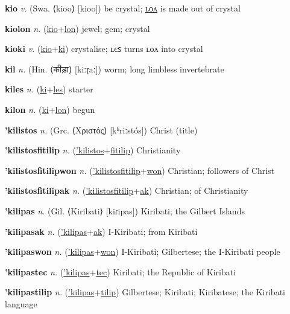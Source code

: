 \textbf{\hypertarget{kio}{kio}} \textit{v.} (Swa. ⟨kioo⟩ [kioo])
be crystal; \hyperlink{kiolon}{ʟᴏᴧ} is made out of crystal

\textbf{\hypertarget{kiolon}{kiolon}} \textit{n.} (\hyperlink{kio}{kio}+\allowbreak \hyperlink{lon}{lon})
jewel; gem; crystal

\textbf{\hypertarget{kioki}{kioki}} \textit{v.} (\hyperlink{kio}{kio}+\allowbreak \hyperlink{ki}{ki})
crystalise; ʟєꜱ turns ʟᴏᴧ into crystal

\textbf{\hypertarget{kil}{kil}} \textit{n.} (Hin. ⟨{\devanagari{}कीड़ा}⟩ [kiːɽaː])
worm; long limbless invertebrate

\textbf{\hypertarget{kiles}{kiles}} \textit{n.} (\hyperlink{ki}{ki}+\allowbreak \hyperlink{les}{les})
starter

\textbf{\hypertarget{kilon}{kilon}} \textit{n.} (\hyperlink{ki}{ki}+\allowbreak \hyperlink{lon}{lon})
begun

\textbf{\hypertarget{'kilistos}{'kilistos}} \textit{n.} (Grc. ⟨Χριστός⟩ [kʰriːstós])
Christ (title)

\textbf{\hypertarget{'kilistosfitilip}{'kilistosfitilip}} \textit{n.} (\hyperlink{'kilistos}{'kilistos}+\allowbreak \hyperlink{fitilip}{fitilip})
Christianity

\textbf{\hypertarget{'kilistosfitilipwon}{'kilistosfitilipwon}} \textit{n.} (\hyperlink{'kilistosfitilip}{'kilistosfitilip}+\allowbreak \hyperlink{won}{won})
Christian; followers of Christ

\textbf{\hypertarget{'kilistosfitilipak}{'kilistosfitilipak}} \textit{n.} (\hyperlink{'kilistosfitilip}{'kilistosfitilip}+\allowbreak \hyperlink{ak}{ak})
Christian; of Christianity

\textbf{\hypertarget{'kilipas}{'kilipas}} \textit{n.} (Gil. ⟨Kiribati⟩ [kiɾipas])
Kiribati; the Gilbert Islands

\textbf{\hypertarget{'kilipasak}{'kilipasak}} \textit{n.} (\hyperlink{'kilipas}{'kilipas}+\allowbreak \hyperlink{ak}{ak})
I-Kiribati; from Kiribati

\textbf{\hypertarget{'kilipaswon}{'kilipaswon}} \textit{n.} (\hyperlink{'kilipas}{'kilipas}+\allowbreak \hyperlink{won}{won})
I-Kiribati; Gilbertese; the I-Kiribati people

\textbf{\hypertarget{'kilipastec}{'kilipastec}} \textit{n.} (\hyperlink{'kilipas}{'kilipas}+\allowbreak \hyperlink{tec}{tec})
Kiribati; the Republic of Kiribati

\textbf{\hypertarget{'kilipastilip}{'kilipastilip}} \textit{n.} (\hyperlink{'kilipas}{'kilipas}+\allowbreak \hyperlink{tilip}{tilip})
Gilbertese; Kiribati; Kiribatese; the Kiribati language

